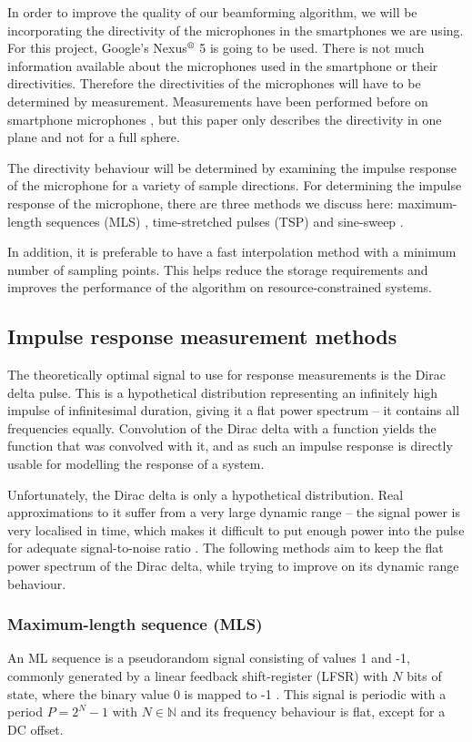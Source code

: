 In order to improve the quality of our beamforming algorithm, we will be incorporating the directivity of the microphones in the smartphones we are using. For this project, Google's Nexus$^\text{\textregistered}$ 5 \cite{nexus5} is going to be used. There is not much information available about the microphones used in the smartphone or their directivities. Therefore the directivities of the microphones will have to be determined by measurement. Measurements have been performed before on smartphone microphones \cite{Gaubitch2014}, but this paper only describes the directivity in one plane and not for a full sphere.

The directivity behaviour will be determined by examining the impulse response of the microphone for a variety of sample directions. For determining the impulse response of the microphone, there are three methods we discuss here: maximum-length sequences (MLS) \cite{hee2003}, time-stretched pulses (TSP) \cite{Aoshima19811484} and sine-sweep \cite{Stan2002249}.

In addition, it is preferable to have a fast interpolation method with a minimum number of sampling points. This helps reduce the storage requirements and improves the performance of the algorithm on resource-constrained systems.

\subsection{Impulse response measurement methods}
The theoretically optimal signal to use for response measurements is the Dirac delta pulse. This is a hypothetical distribution representing an infinitely high impulse of infinitesimal duration, giving it a flat power spectrum -- it contains all frequencies equally. Convolution of the Dirac delta with a function yields the function that was convolved with it, and as such an impulse response is directly usable for modelling the response of a system.

Unfortunately, the Dirac delta is only a hypothetical distribution. Real approximations to it suffer from a very large dynamic range -- the signal power is very localised in time, which makes it difficult to put enough power into the pulse for adequate signal-to-noise ratio \cite{hee2003}. The following methods aim to keep the flat power spectrum of the Dirac delta, while trying to improve on its dynamic range behaviour.

\subsubsection{Maximum-length sequence (MLS)}
An ML sequence is a pseudorandom signal consisting of values 1 and -1, commonly generated by a linear feedback shift-register (LFSR) with $N$ bits of state, where the binary value 0 is mapped to -1 \cite{hee2003}. This signal is periodic with a period $P=2^N-1$ with $N\in\mathbb{N}$ and its frequency behaviour is flat, except for a DC offset.

